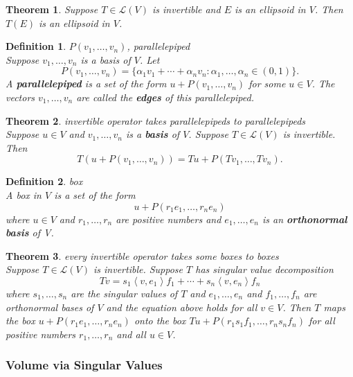 \documentclass{article}
\newtheorem{theorem}{Theorem}[subsection]
\newtheorem{definition}{Definition}[subsection]
\begin{document}
\begin{CJK}{UTF8}{gkai}
\begin{theorem}
    Suppose $T \in \mathcal{L}(V)$ is invertible and $E$ is an ellipsoid in $V$. Then $T(E)$ is an ellipsoid in $V$.
\end{theorem}

\begin{definition}
    $P(v_1,\ldots,v_n)$, parallelepiped\\

    Suppose $v_1,\ldots,v_n$ is a basis of $V$. Let
    \[P(v_1,\ldots,v_n) = \{\alpha_1 v_1 + \cdots+\alpha_n v_n: \alpha_1,\ldots,\alpha_n \in (0,1)\}.\]
    A \textbf{parallelepiped} is a set of the form $u + P(v_1,\ldots,v_n)$ for some $u \in V$. The vectors $v_1,\ldots,v_n$ are called the \textbf{edges} of this parallelepiped.
\end{definition}

\begin{theorem}
    invertible operator takes parallelepipeds to parallelepipeds\\

    Suppose $u \in V$ and $v_1,\ldots,v_n$ is a \textbf{basis} of $V$. Suppose $T \in \mathcal{L}(V)$ is invertible. Then
    \[T(u +P(v_1,\ldots,v_n)) = Tu+P(Tv_1,\ldots,Tv_n).\]
\end{theorem}

\begin{definition}
    box\\

    A box in $V$ is a set of the form
    \[u +P(r_1e_1,\ldots,r_n e_n)\]
    where $u \in V$ and $r_1,\ldots,r_n$ are positive numbers and $e_1,\ldots,e_n$ is an \textbf{orthonormal} \textbf{basis} of V.
\end{definition}

\begin{theorem}
    every invertible operator takes some boxes to boxes\\

    Suppose $T \in \mathcal{L}(V)$ is invertible. Suppose $T$ has singular value decomposition
    \[Tv =s_1\left<v,e_1\right>f_1 + \cdots+s_n\left<v,e_n\right>f_n\]
    where $s_1,\ldots,s_n$ are the singular values of $T$ and $e_1,\ldots,e_n$ and $f_1,\ldots, f_n$ are orthonormal bases of $V$ and the equation above holds for all $v \in V$. Then $T$ maps the box $u +P(r_1e_1,\ldots,r_n e_n)$ onto the box $Tu + P(r_1 s_1 f_1,\ldots,r_n s_n f_n)$ for all positive numbers $r_1,\ldots,r_n$ and all $u \in V$.
\end{theorem}

\subsubsection{Volume via Singular Values}


\end{CJK}
\end{document}
